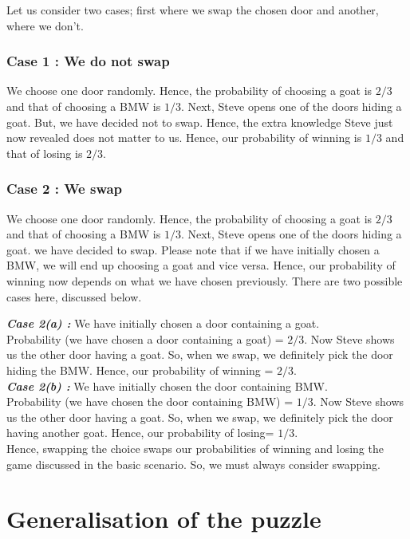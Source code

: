 \documentclass{book}
\begin{document}
Let us consider two cases; first where we swap the chosen door and another, where we don't. 

\subsubsection{Case 1 : We do not swap}
We choose one door randomly. Hence, the probability of choosing a goat is $2/3$ and that of choosing a BMW is  $1/3$. Next, Steve opens one of the doors hiding a goat. But, we have decided not to swap. Hence, the extra knowledge Steve just now revealed does not matter to us. Hence, our probability of winning is $1/3$ and that of losing is $2/3$.

\subsubsection{Case 2 : We swap}
We choose one door randomly. Hence, the probability of choosing a goat is $2/3$ and that of choosing a BMW is  $1/3$. Next, Steve opens one of the doors hiding a goat. we have decided to swap. Please note that if we have initially chosen a BMW, we will end up choosing a goat and vice versa. Hence, our probability of winning now depends on what we have chosen previously. There are two possible cases here, discussed below. 

\textbf{\textit{Case 2(a) :}} We have initially chosen a door containing a goat.\\ 
Probability (we have chosen a door containing a goat) = $2/3$. Now Steve shows us the other door having a goat. So, when we swap, we definitely pick the door hiding the BMW. Hence, our probability of winning = $2/3$. \\

\textbf{\textit{Case 2(b) : }}We have initially chosen the door containing BMW.\\ 
Probability (we have chosen the door containing BMW) = $1/3$. Now Steve shows us the other door having a goat. So, when we swap, we definitely pick the door having another goat. Hence, our probability of losing= $1/3$.\\

Hence, swapping the choice swaps our probabilities of winning and losing the game discussed in the basic scenario. So, we must always consider swapping.

\section{Generalisation of the puzzle}
\end{document}
